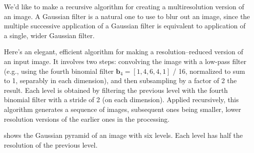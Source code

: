 We'd like to make a recursive algorithm for creating a multiresolution version of an image.  
A Gaussian filter is a natural
one to use to blur out an image, since the multiple successive application of a Gaussian filter is equivalent to application of a single, wider
Gaussian filter.

Here's an elegant, efficient algorithm for making a resolution--reduced version of an input image.  It involves two steps:  convolving the
image with a low-pass filter (e.g., using the fourth binomial filter $\mathbf{b}_4 = [1, 4, 6, 4, 1]$ / 16, normalized to sum to 1, separably in each dimension), and then subsampling by a factor of 2 the result. Each level is obtained by filtering the previous level with the fourth binomial filter with a stride of 2 (on each dimension). Applied recursively, this algorithm generates a sequence of images,  subsequent ones being smaller, lower resolution versions of the earlier ones in the processing.


\Fig{\ref{fig:gausspyr}} shows the Gaussian pyramid of an image with six levels. Each level has half the resolution of the previous level.  

